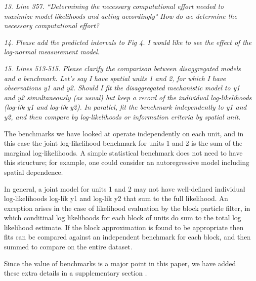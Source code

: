 \documentclass[11pt]{article}
\newcommand\report[1]{{\color{mygreen} \vspace{1mm}\hspace{0.25in}\parbox{6in}{\em #1}}}
\begin{document}
\report{
  13. Line 357. ``Determining the necessary computational effort needed to maximize model likelihoods and acting accordingly" How do we determine the necessary computational effort?
}


\report{
  14. Please add the predicted intervals to Fig 4. I would like to see the effect of the log-normal measurement model.
}


\report{
  15. Lines 513-515. Please clarify the comparison between disaggregated models and a benchmark. Let’s say I have spatial units 1 and 2, for which I have observations y1 and y2. Should I fit the disaggregated mechanistic model to y1 and y2 simultaneously (as usual) but keep a record of the individual log-likelihoods (log-lik y1 and log-lik y2). In parallel, fit the benchmark independently to y1 and y2, and then compare by log-likelihoods or information criteria by spatial unit.
}

The benchmarks we have looked at operate independently on each unit, and in this case the joint log-likelihood benchmark for units 1 and 2 is the sum of the marginal log-likelihoods.
A simple statistical benchmark does not need to have this structure; for example, one could consider an autoregressive model including spatial dependence.

In general, a joint model for units 1 and 2 may not have well-defined individual log-likelihoods log-lik y1 and log-lik y2 that sum to the full likelihood.
An exception arises in the case of likelihood evaluation by the block particle filter, in which conditinal log likelihoods for each block of units do sum to the total log likelihood estimate.
If the block approximation is found to be appropriate \cite{ionides21,ionides22} then fits can be compared against an independent benchmark for each block, and then summed to compare on the entire dataset.

Since the value of benchmarks is a major point in this paper, we have added these extra details in a supplementary section \TODO{}.
\end{document}
